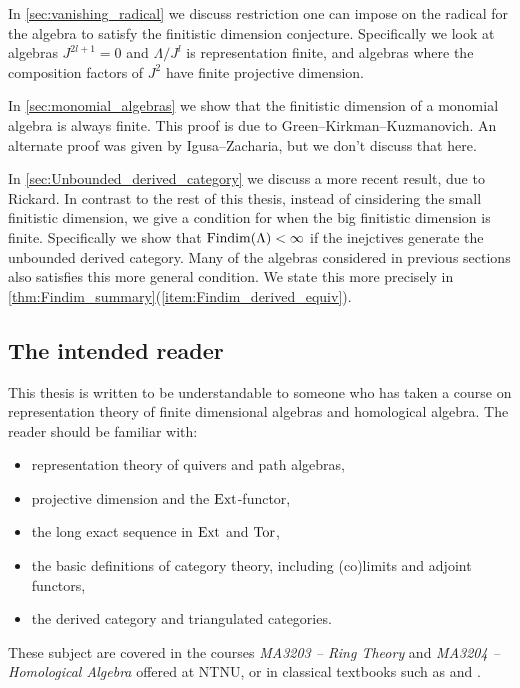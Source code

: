 In \cref{sec:vanishing_radical} we discuss restriction one can impose on the radical for the algebra to satisfy the finitistic dimension conjecture. Specifically we look at algebras $J^{2l+1}=0$ and $\Lambda/J^l$ is representation finite, and algebras where the composition factors of $J^2$ have finite projective dimension.

In \cref{sec:monomial_algebras} we show that the finitistic dimension of a monomial algebra is always finite. This proof is due to Green--Kirkman--Kuzmanovich\cite{GKK91}. An alternate proof was given by Igusa--Zacharia\cite{IgZa90}, but we don't discuss that here.

In \cref{sec:Unbounded_derived_category} we discuss a more recent result, due to Rickard\cite{Rick19}. In contrast to the rest of this thesis, instead of cinsidering the small finitistic dimension, we give a condition for when the big finitistic dimension is finite. Specifically we show that $\operatorname{Findim}(\Lambda) < \infty$ if the inejctives generate the unbounded derived category. Many of the algebras considered in previous sections also satisfies this more general condition. We state this more precisely in \cref{thm:Findim_summary}(\ref{item:Findim_derived_equiv}).

\subsection*{The intended reader}
This thesis is written to be understandable to someone who has taken a course on representation theory of finite dimensional algebras and homological algebra. The reader should be familiar with: 
\renewcommand\labelitemi{---}
\begin{itemize}
  \item representation theory of quivers and path algebras,
  \item projective dimension and the $\operatorname{Ext}$-functor,
  \item the long exact sequence in $\operatorname{Ext}$ and $\operatorname{Tor}$,
  \item the basic definitions of category theory, including (co)limits and adjoint functors,
  \item the derived category and triangulated categories.
\end{itemize}
These subject are covered in the courses \textit{MA3203 -- Ring Theory} and \textit{MA3204 -- Homological Algebra} offered at NTNU, or in classical textbooks such as \cite{ARS97} and \cite{Wei94}.